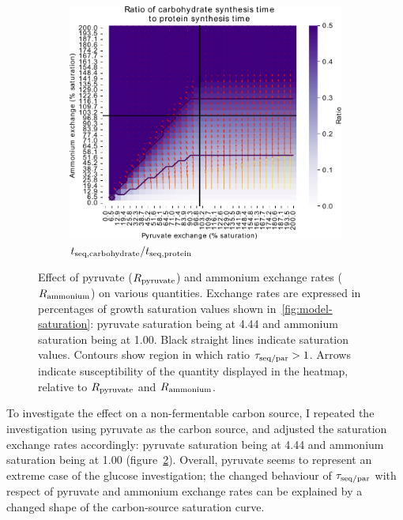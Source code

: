 \begin{figure}
  \begin{subfigure}[t]{0.45\textwidth}
  \centering
    \includegraphics[width=\linewidth]{ec_grid_pyr_amm_carb_to_prot}
    \caption{
      $t_{\mathrm{seq},\mathrm{carbohydrate}}/t_{\mathrm{seq},\mathrm{protein}}$
    }
    \label{fig:model-grid-pyr-carb-to-prot}
  \end{subfigure}
  \caption{
    Effect of pyruvate ($R_{\mathrm{pyruvate}}$) and ammonium exchange rates ($R_{\mathrm{ammonium}}$) on various quantities.
    Exchange rates are expressed in percentages of growth saturation values shown in~\ref{fig:model-saturation}: pyruvate saturation being at \SI{4.44}{\mmolgdwh} and ammonium saturation being at \SI{1.00}{\mmolgdwh}.
    Black straight lines indicate saturation values.
    Contours show region in which ratio $\tau_{\mathrm{seq}/\mathrm{par}} > 1$.
    Arrows indicate susceptibility of the quantity displayed in the heatmap, relative to $R_{\mathrm{pyruvate}}$ and $R_{\mathrm{ammonium}}$.
  }
  \label{fig:model-grid-pyr}
\end{figure}

To investigate the effect on a non-fermentable carbon source, I repeated the investigation using pyruvate as the carbon source, and adjusted the saturation exchange rates accordingly: pyruvate saturation being at \SI{4.44}{\mmolgdwh} and ammonium saturation being at \SI{1.00}{\mmolgdwh} (figure~\ref{fig:model-grid-pyr}).
Overall, pyruvate seems to represent an extreme case of the glucose investigation; the changed behaviour of $\tau_{\mathrm{seq}/\mathrm{par}}$ with respect of pyruvate and ammonium exchange rates can be explained by a changed shape of the carbon-source saturation curve.

